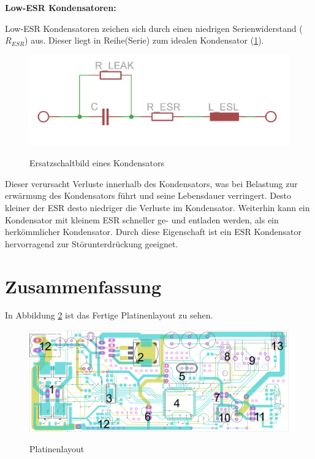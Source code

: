 \begin{minipage}{0.9\textwidth}
\textbf{Low-ESR Kondensatoren:\\}

Low-ESR Kondensatoren zeichen sich durch einen niedrigen Serienwiderstand ($R_{ESR}$) aus.
Dieser liegt in Reihe(Serie) zum idealen Kondensator (\cref{fig:esr}). 

\begin{figure}[H]
\centering
\includegraphics[width=.56\textwidth]{esr.png}\\
\caption{Ersatzschaltbild eines Kondensators}%
\label{fig:esr}
\end{figure}

Dieser verursacht Verluste innerhalb des Kondensators, was bei Belastung zur erwärmung des Kondensators führt und
seine Lebensdauer verringert. Desto kleiner der ESR desto niedriger die Verluste im Kondensator. Weiterhin
kann ein Kondensator mit kleinem ESR schneller ge- und entladen werden, als ein herkömmlicher Kondensator.
Durch diese Eigenschaft ist ein ESR Kondensator hervorragend zur Störunterdrückung geeignet.
\end{minipage}





\section{Zusammenfassung}
In Abbildung \ref{fig:layout} ist das Fertige Platinenlayout zu sehen.

\begin{figure}[H]
\centering
\includegraphics[width=.56\textwidth]{platinen_layout_scr.png}\\
\caption{Platinenlayout}%
\label{fig:layout}
\end{figure}


